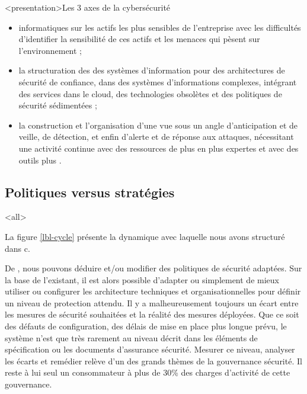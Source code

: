 \begin{frame}<presentation>{Les 3 axes de la cybersécurité}
	\begin{itemize}
 \item {} informatiques sur les actifs les plus sensibles de l'entreprise avec les difficultés d'identifier la sensibilité de ces actifs et les menaces qui pèsent sur l'environnement ;
\item la structuration des  des systèmes d'information pour des architectures de sécurité de confiance, dans des systèmes d'informations complexes, intégrant des services dans le cloud, des technologies obsolètes et des politiques de sécurité sédimentées ;
\item la construction et l’organisation d'une  vue sous un angle d'anticipation et de veille, de détection, et enfin d'alerte et de réponse aux attaques, nécessitant une activité continue avec des ressources de plus en plus expertes et avec des outils plus .
\end{itemize}
\end{frame}

\subsection {Politiques versus stratégies}

\mode<all>{
}

La figure \ref{lbl-cycle} présente la dynamique avec laquelle nous avons structuré dans c\edoc.


De  , nous pouvons déduire et/ou modifier des politiques de sécurité adaptées. 
Sur la base de l’existant, il est alors possible d’adapter ou simplement de mieux utiliser ou configurer les architecture techniques et organisationnelles pour définir un niveau de protection attendu.
Il y a malheureusement toujours un écart entre les mesures de sécurité souhaitées et la réalité des mesures déployées. Que ce soit des défauts de configuration, des délais de mise en place plus longue prévu, le système n’est que très rarement au niveau décrit dans les éléments de spécification ou les documents d'assurance sécurité.
Mesurer ce niveau, analyser les écarts et remédier relève d’un des grands thèmes de la gouvernance sécurité. Il reste à lui seul un consommateur à plus de 30\% des charges d'activité de cette gouvernance.

